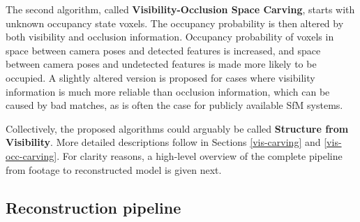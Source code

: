 The second algorithm, called \textbf{Visibility-Occlusion Space Carving}, starts with unknown occupancy state voxels. The occupancy probability is then altered by both visibility and occlusion information. Occupancy probability of voxels in space between camera poses and detected features is increased, and space between camera poses and undetected features is made more likely to be occupied. A slightly altered version is proposed for cases where visibility information is much more reliable than occlusion information, which can be caused by bad matches, as is often the case for publicly available SfM systems.

Collectively, the proposed algorithms could arguably be called \textbf{Structure from Visibility}. More detailed descriptions follow in Sections \ref{vis-carving} and \ref{vis-occ-carving}. For clarity reasons, a high-level overview of the complete pipeline from footage to reconstructed model is given next.


\subsection{Reconstruction pipeline}  \label{pipeline}

